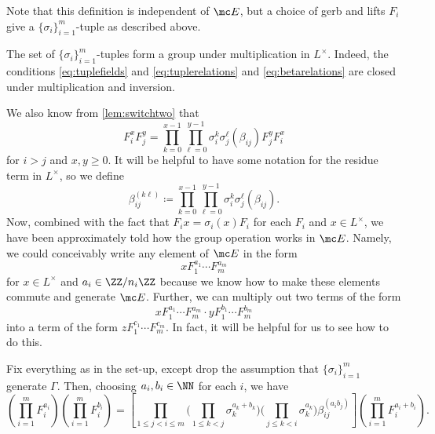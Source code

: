 \documentclass{article}
\numberwithin{equation}{section}
\begin{document}
Note that this definition is independent of $\mc E$, but a choice of gerb and lifts $F_i$ give a $\{\sigma_i\}_{i=1}^m$-tuple as described above.
\begin{remark}
	The set of $\{\sigma_i\}_{i=1}^m$-tuples form a group under multiplication in $L^\times$. Indeed, the conditions \autoref{eq:tuplefields} and \autoref{eq:tuplerelations} and \autoref{eq:betarelations} are closed under multiplication and inversion.
\end{remark}
We also know from \autoref{lem:switchtwo} that
\[F_i^xF_j^y=\prod_{k=0}^{x-1}\prod_{\ell=0}^{y-1}\sigma_i^k\sigma_j^\ell(\beta_{ij})F_j^yF_i^x\]
for $i>j$ and $x,y\ge0$. It will be helpful to have some notation for the residue term in $L^\times$, so we define
\[\beta_{ij}^{(k\ell)}\coloneqq\prod_{k=0}^{x-1}\prod_{\ell=0}^{y-1}\sigma_i^k\sigma_j^\ell(\beta_{ij}).\]
Now, combined with the fact that $F_ix=\sigma_i(x)F_i$ for each $F_i$ and $x\in L^\times$, we have been approximately told how the group operation works in $\mc E$. Namely, we could conceivably write any element of $\mc E$ in the form
\[xF_1^{a_1}\cdots F_m^{a_m}\]
for $x\in L^\times$ and $a_i\in\ZZ/n_i\ZZ$ because we know how to make these elements commute and generate $\mc E$. Further, we can multiply out two terms of the form
\[xF_1^{a_1}\cdots F_m^{a_m}\cdot yF_1^{b_1}\cdots F_m^{b_m}\]
into a term of the form $zF_1^{c_1}\cdots F_m^{c_m}$. In fact, it will be helpful for us to see how to do this.
\begin{proposition} \label{prop:multiplytwoelements}
	Fix everything as in the set-up, except drop the assumption that $\{\sigma_i\}_{i=1}^m$ generate $\Gamma$. Then, choosing $a_i,b_i\in\NN$ for each $i$, we have
	\[\left(\prod_{i=1}^mF_i^{a_i}\right)\left(\prod_{i=1}^mF_i^{b_i}\right)=\left[\prod_{1\le j<i\le m}\Bigg(\prod_{1\le k<j}\sigma_k^{a_k+b_k}\Bigg)\Bigg(\prod_{j\le k<i}\sigma_k^{a_k}\Bigg)\beta_{ij}^{(a_ib_j)}\right]\left(\prod_{i=1}^mF_i^{a_i+b_i}\right).\]
\end{proposition}
\end{document}

